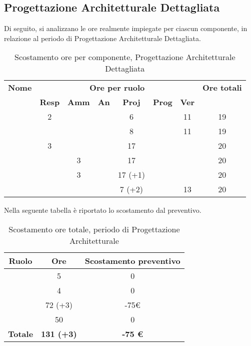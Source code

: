 \subsection{Progettazione Architetturale Dettagliata}

Di seguito, si analizzano le ore realmente impiegate per ciascun componente, in relazione al periodo di Progettazione Architetturale Dettagliata.

\begin{table}[H]
	\begin{center}
		\begin{tabular}{|c|c|c|c|c|c|c|c|}
			\hline
			\textbf{Nome} & \multicolumn{6}{c|}{\textbf{Ore per ruolo}} & \textbf{Ore totali} \\\cline{2-7}
			& \textbf{Resp} & \textbf{Amm} & \textbf{An} & \textbf{Proj} & \textbf{Prog} & \textbf{Ver} & \\
			\hline
			\MC			&	2	&		&		&	6	&		&	11	&	19	\\
			\hline
			\AN			&		&		&		&	8	&   	&	11	& 	19	\\
			\hline
			\DAN		&	3	&		&		&	17	&		&		&	20	\\
			\hline
			\AS			&		&	3	&	 	&	17	&	 	& 		&	20	\\
			\hline
			\NS 		&		&	3	&		&	17 (+1)	&		& 		&	20	\\
			\hline
			\DS			& 		&		&		&	7 (+2)	&		&	13	&	20	\\
			\hline
		\end{tabular}
	\end{center}
	\caption{Scostamento ore per componente, Progettazione Architetturale Dettagliata}
\end{table}

Nella seguente tabella è riportato lo scostamento dal preventivo.

\begin{table}[H]
	\begin{center}
		\begin{tabular}{|c|c|c|}
			\hline
			\textbf{Ruolo}	& \textbf{Ore}	& \textbf{Scostamento preventivo} \\
			\hline
			\Res	&	5	&	0	\\
			\hline
			\Amm	&	4	&	0	\\
			\hline
			\Prog   &	72 (+3)  &	-75€	\\
			\hline
			\Ver	&	50	&	0 \\
			\hline
			\textbf{Totale} & \textbf{131 (+3)} & \textbf{-75 €}\\
			\hline
		\end{tabular}
	\end{center}
	\caption{Scostamento ore totale, periodo di Progettazione Architetturale}
\end{table}

